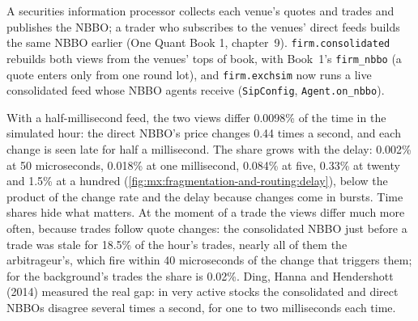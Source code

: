 A securities information processor collects each venue's quotes and trades and publishes the NBBO; a trader who subscribes to the venues' direct feeds
builds the same NBBO earlier (One Quant Book 1, chapter~9). \texttt{firm.consolidated} rebuilds both views from the venues' tops of book, with Book~1's
\texttt{firm\_nbbo} (a quote enters only from one round lot), and \texttt{firm.exchsim} now runs a live consolidated feed whose NBBO agents receive
(\texttt{SipConfig}, \texttt{Agent.on\_nbbo}).

With a half-millisecond feed, the two views differ 0.0098\% of the time in the simulated hour: the direct NBBO's price changes 0.44 times a second, and
each change is seen late for half a millisecond. The share grows with the delay: 0.002\% at 50 microseconds, 0.018\% at one millisecond, 0.084\% at five,
0.33\% at twenty and 1.5\% at a hundred (\cref{fig:mx:fragmentation-and-routing:delay}), below the product of the change rate and the delay because
changes come in bursts. Time shares hide what matters. At the moment of a trade the views differ much more often, because trades follow quote changes:
the consolidated NBBO just before a trade was stale for 18.5\% of the hour's trades, nearly all of them the arbitrageur's, which fire within 40
microseconds of the change that triggers them; for the background's trades the share is 0.02\%. Ding, Hanna and Hendershott (2014) measured the real
gap: in very active stocks the consolidated and direct NBBOs disagree several times a second, for one to two milliseconds each time.

\begin{omfigure}

\label{fig:mx:fragmentation-and-routing:delay}
\end{omfigure}

